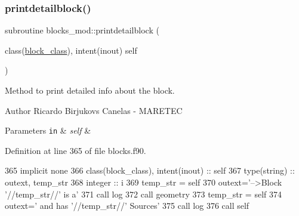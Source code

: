 \subsubsection{\texorpdfstring{printdetailblock()}{printdetailblock()}}
{\footnotesize\ttfamily subroutine blocks\+\_\+mod\+::printdetailblock (\begin{DoxyParamCaption}\item[{class(\mbox{\hyperlink{structblocks__mod_1_1block__class}{block\+\_\+class}}), intent(inout)}]{self }\end{DoxyParamCaption})\hspace{0.3cm}{\ttfamily [private]}}



Method to print detailed info about the block. 

\begin{DoxyAuthor}{Author}
Ricardo Birjukovs Canelas -\/ M\+A\+R\+E\+T\+EC 
\end{DoxyAuthor}

\begin{DoxyParams}[1]{Parameters}
\mbox{\tt in}  & {\em self} & \\
\hline
\end{DoxyParams}


Definition at line 365 of file blocks.\+f90.


\begin{DoxyCode}
365     \textcolor{keywordtype}{implicit none}
366     \textcolor{keywordtype}{class}(block\_class), \textcolor{keywordtype}{intent(inout)} :: self
367     \textcolor{keywordtype}{type}(string) :: outext, temp\_str
368     \textcolor{keywordtype}{integer} :: i
369     temp\_str = self%
370     outext=\textcolor{stringliteral}{'-->Block '}//temp\_str//\textcolor{stringliteral}{' is a'}
371     \textcolor{keyword}{call }log%
372     \textcolor{keyword}{call }geometry%
373     temp\_str = self%
374     outext=\textcolor{stringliteral}{'      and has '}//temp\_str//\textcolor{stringliteral}{' Sources'}
375     \textcolor{keyword}{call }log%
376     \textcolor{keyword}{call }self%
\end{DoxyCode}
\mbox{\label{namespaceblocks__mod_ae3bd1bfeee831f4b41932839495bb108}} 
